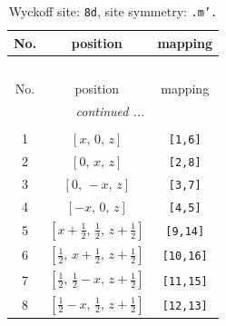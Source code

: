 \documentclass[fleqn,8pt]{jsarticle}
\begin{document}
\begin{longtable}{ccc}
\caption{Wyckoff site: {\tt 8d}, site symmetry: {\tt .m'.}}
 \\
 \hline \hline
No. & position & mapping \\ \hline \endfirsthead

\multicolumn{2}{l}{\tablename\ \thetable{}} \\
 \hline \hline
No. & position & mapping \\ \hline \endhead

 \hline \hline
\multicolumn{2}{r}{\footnotesize\it continued ...} \\ \endfoot

 \hline \hline
\multicolumn{2}{r}{} \\ \endlastfoot

1 & $\left[ x,\, 0,\, z \right]$ & {\tt [1,6]} \\ \hline
2 & $\left[ 0,\, x,\, z \right]$ & {\tt [2,8]} \\ \hline
3 & $\left[ 0,\, - x,\, z \right]$ & {\tt [3,7]} \\ \hline
4 & $\left[ - x,\, 0,\, z \right]$ & {\tt [4,5]} \\ \hline
5 & $\left[ x + \frac{1}{2},\, \frac{1}{2},\, z + \frac{1}{2} \right]$ & {\tt [9,14]} \\ \hline
6 & $\left[ \frac{1}{2},\, x + \frac{1}{2},\, z + \frac{1}{2} \right]$ & {\tt [10,16]} \\ \hline
7 & $\left[ \frac{1}{2},\, \frac{1}{2} - x,\, z + \frac{1}{2} \right]$ & {\tt [11,15]} \\ \hline
8 & $\left[ \frac{1}{2} - x,\, \frac{1}{2},\, z + \frac{1}{2} \right]$ & {\tt [12,13]} \\
\end{longtable}
\renewcommand{\arraystretch}{1.2}
\end{document}

